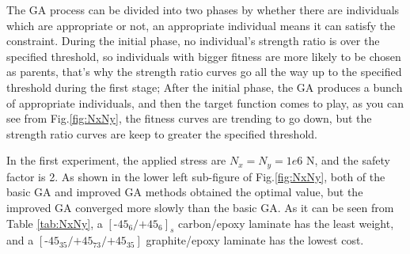 \documentclass[Afour,sageh,times]{sagej}
\begin{document}
The GA process can be divided into two phases by whether there are individuals which are
appropriate or not,
an appropriate individual means it can satisfy the constraint. During the initial phase, no individual's
strength ratio is over the specified threshold, so individuals with bigger fitness are more likely to be
chosen as parents, that's why the strength ratio curves go all the way up to the specified
threshold during the first stage; After the initial phase, the GA produces a bunch of appropriate
individuals, and then the target function comes to play, as you can see from Fig.\ref{fig:NxNy}, the
fitness curves are trending to go down, but the strength ratio curves are keep to greater the
specified threshold.


In the first experiment, the applied stress are $N_x=N_y=1e6$ N, and the safety
factor is 2.  As shown in the lower left sub-figure of Fig.\ref{fig:NxNy}, both
of the basic GA and improved GA methods obtained the optimal value, but the
improved GA converged more slowly than the basic GA. As it can be seen from
Table \ref{tab:NxNy}, a $[\text{-}45_{6}/\text{+}45_{6}]_s$ carbon/epoxy
laminate has the least weight, and a
$[\text{-}45_{35}/\text{+}45_{73}/\text{+}45_{35}]$ graphite/epoxy laminate
has the lowest cost.
\end{document}
